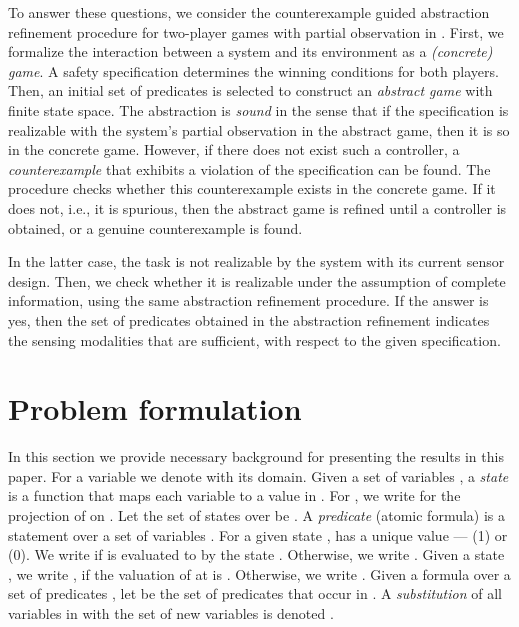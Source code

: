 \documentclass[letterpaper, 10 pt, conference]{ieeeconf}
\begin{document}
To answer these questions, we consider the counterexample guided
abstraction refinement procedure for two-player games with partial
observation in \cite{DimitrovaF08} . First, we formalize the interaction between a system
and its environment as a \emph{(concrete) game}.  A
safety specification determines the winning conditions for both
players. Then, an initial set of  predicates is selected to construct an
\emph{abstract game} with finite state space. The abstraction is
\emph{sound} in the sense that if the specification is realizable with the
system's partial observation in the abstract game, then it is so in
the concrete game.  However, if there does not exist such a
controller, a \emph{counterexample} that exhibits a violation of the
specification can be found. The procedure checks whether
this counterexample exists in the concrete game. If it does not, i.e., it is 
spurious, then the abstract game is refined until a
controller is obtained, or a genuine counterexample is found.

In the latter case, the task is not realizable by the system with its
current sensor design.  Then, we check whether it is realizable under
the assumption of complete information, using the same abstraction
refinement procedure. If the answer is yes, then the set of predicates
obtained in the abstraction refinement indicates the sensing
modalities that are sufficient, with respect to the given specification.

\section{Problem formulation}
\label{sec:problemformulation}


In this section we provide necessary background for presenting the
results in this paper.  
For a variable  we denote with  its domain. Given a set of
variables , a \emph{state}  is a function  that maps each variable  to a value in
. For , we write  for the projection
of  on .  Let the set of states over  be .  A
\emph{predicate} (atomic formula)  is a statement over a set of variables .  For
a given state ,  has a unique value --- (1) or 
 (0). We write  if  is evaluated to  by the state
 . Otherwise, we write . Given a state , we write , if the valuation of
 at  is . Otherwise, we write .
Given a formula  over a
set of predicates , let  be the set of predicates that occur in . 
 A \emph{substitution} of all variables  in  with
the set of new variables  is denoted .
\end{document}
